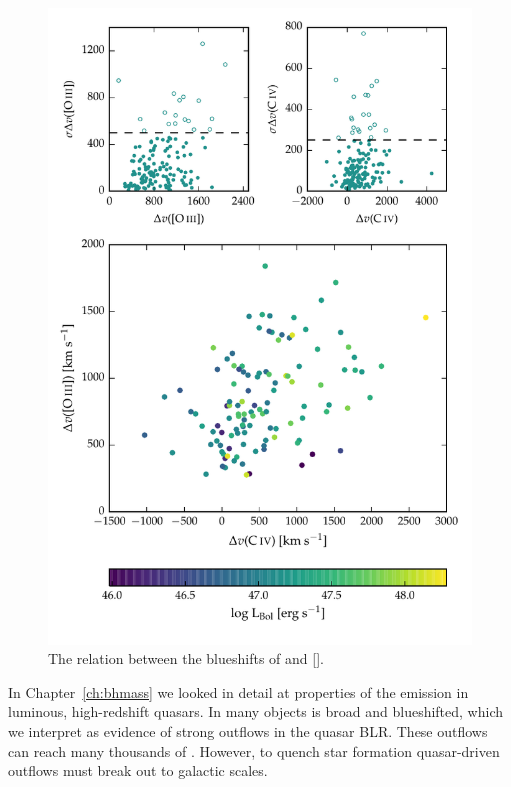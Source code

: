 \begin{figure}
    \includegraphics[width=\columnwidth]{figures/chapter04/civ_blueshift_oiii_blueshift.pdf} 
    \caption[{The relation between the blueshifts of  and [].}]{The relation between the blueshifts of  and [].}     
    \label{fig:oiii_civ_blueshifts}
\end{figure}

In Chapter~\ref{ch:bhmass} we looked in detail at properties of the  emission in luminous, high-redshift quasars. 
In many objects  is broad and blueshifted, which we interpret as evidence of strong outflows in the quasar BLR. 
These outflows can reach many thousands of \kms. 
However, to quench star formation quasar-driven outflows must break out to galactic scales. 

